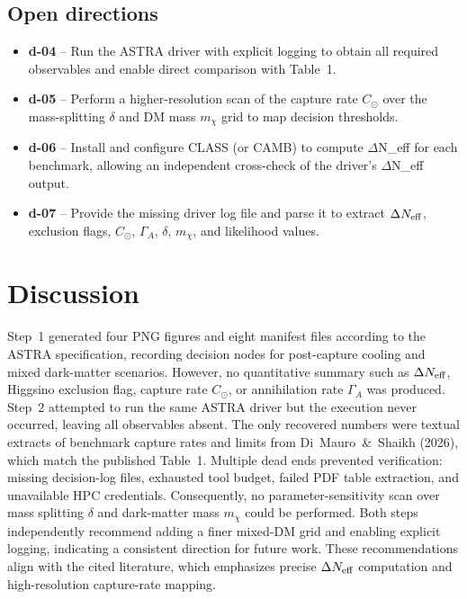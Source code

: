 \documentclass[11pt,a4paper]{article}
\begin{document}
\subsection{Open directions}
\begin{itemize}
  \item \textbf{d-04} -- Run the ASTRA driver with explicit logging to obtain all required observables and enable direct comparison with Table~1.
  \item \textbf{d-05} -- Perform a higher-resolution scan of the capture rate $C_{\odot}$ over the mass-splitting $\delta$ and DM mass $m_\chi$ grid to map decision thresholds.
  \item \textbf{d-06} -- Install and configure CLASS (or CAMB) to compute $\Delta$N\_eff for each benchmark, allowing an independent cross-check of the driver's $\Delta$N\_eff output.
  \item \textbf{d-07} -- Provide the missing driver log file and parse it to extract $\Delta N_{\rm eff}$, exclusion flags, $C_{\odot}$, $\Gamma_A$, $\delta$, $m_\chi$, and likelihood values.
\end{itemize}

\section{Discussion}
Step~1 generated four PNG figures and eight manifest files according to the ASTRA specification, recording decision nodes for post-capture cooling and mixed dark-matter scenarios. However, no quantitative summary such as $\Delta N_{\rm eff}$, Higgsino exclusion flag, capture rate $C_{\odot}$, or annihilation rate $\Gamma_A$ was produced. Step~2 attempted to run the same ASTRA driver but the execution never occurred, leaving all observables absent. The only recovered numbers were textual extracts of benchmark capture rates and limits from Di~Mauro~\&~Shaikh (2026), which match the published Table~1. Multiple dead ends prevented verification: missing decision-log files, exhausted tool budget, failed PDF table extraction, and unavailable HPC credentials. Consequently, no parameter-sensitivity scan over mass splitting $\delta$ and dark-matter mass $m_\chi$ could be performed. Both steps independently recommend adding a finer mixed-DM grid and enabling explicit logging, indicating a consistent direction for future work. These recommendations align with the cited literature, which emphasizes precise $\Delta N_{\rm eff}$ computation and high-resolution capture-rate mapping.
\end{document}
